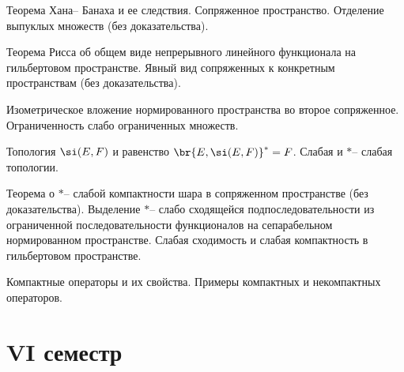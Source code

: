 \documentclass[a4paper]{article}
\begin{document}
\begin{nums}{-2}
\item Теорема Хана-- Банаха и ее следствия. Сопряженное пространство. Отделение выпуклых множеств (без доказательства).
\item Теорема Рисса об общем виде непрерывного линейного функционала на гильбертовом пространстве. Явный вид сопряженных
      к конкретным пространствам (без доказательства).
\item Изометрическое вложение нормированного пространства во второе сопряженное. Ограниченность слабо ограниченных множеств.
\item Топология $\si(E,F)$ и равенство $\br{E, \si(E,F)}^* = F$. Слабая и $*$-- слабая топологии.
\item Теорема о $*$-- слабой компактности шара в сопряженном пространстве (без доказательства).
      Выделение $*$-- слабо сходящейся подпоследовательности из ограниченной последовательности
      функционалов на сепарабельном нормированном пространстве.
      Слабая сходимость и слабая компактность в гильбертовом пространстве.
\item Компактные операторы и их свойства. Примеры компактных и некомпактных операторов.
\end{nums}

\medskip\dmvntrail

\pagebreak

\section*{VI семестр}
\end{document}

